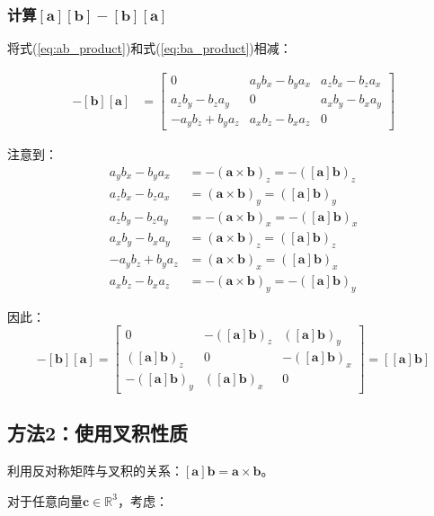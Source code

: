 \documentclass[12pt,a4paper]{article}
\begin{document}
\subsubsection{计算$[\bm{a}][\bm{b}] - [\bm{b}][\bm{a}]$}

将式(\ref{eq:ab_product})和式(\ref{eq:ba_product})相减：

\begin{align}
[\bm{a}][\bm{b}] - [\bm{b}][\bm{a}] &= \begin{bmatrix}
0 & a_y b_x - b_y a_x & a_z b_x - b_z a_x \\
a_z b_y - b_z a_y & 0 & a_x b_y - b_x a_y \\
-a_y b_z + b_y a_z & a_x b_z - b_x a_z & 0
\end{bmatrix}
\end{align}

注意到：
\begin{align}
a_y b_x - b_y a_x &= -(\bm{a} \times \bm{b})_z = -([\bm{a}]\bm{b})_z \\
a_z b_x - b_z a_x &= (\bm{a} \times \bm{b})_y = ([\bm{a}]\bm{b})_y \\
a_z b_y - b_z a_y &= -(\bm{a} \times \bm{b})_x = -([\bm{a}]\bm{b})_x \\
a_x b_y - b_x a_y &= (\bm{a} \times \bm{b})_z = ([\bm{a}]\bm{b})_z \\
-a_y b_z + b_y a_z &= (\bm{a} \times \bm{b})_x = ([\bm{a}]\bm{b})_x \\
a_x b_z - b_x a_z &= -(\bm{a} \times \bm{b})_y = -([\bm{a}]\bm{b})_y
\end{align}

因此：
\begin{equation}
[\bm{a}][\bm{b}] - [\bm{b}][\bm{a}] = \begin{bmatrix}
0 & -([\bm{a}]\bm{b})_z & ([\bm{a}]\bm{b})_y \\
([\bm{a}]\bm{b})_z & 0 & -([\bm{a}]\bm{b})_x \\
-([\bm{a}]\bm{b})_y & ([\bm{a}]\bm{b})_x & 0
\end{bmatrix} = [[\bm{a}]\bm{b}]
\label{eq:result}
\end{equation}

\subsection{方法2：使用叉积性质}

利用反对称矩阵与叉积的关系：$[\bm{a}]\bm{b} = \bm{a} \times \bm{b}$。

对于任意向量$\bm{c} \in \mathbb{R}^3$，考虑：
\end{document}
